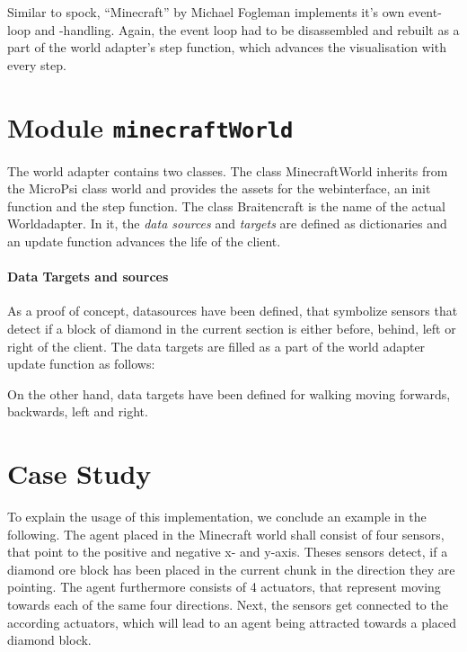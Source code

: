 Similar to spock, ``Minecraft'' by Michael Fogleman implements it's own event-loop and -handling. Again, the event loop had to be disassembled and rebuilt as a part of the world adapter's step function, which advances the visualisation with every step.

    \section{Module \texttt{minecraftWorld}}
The world adapter contains two classes. The class MinecraftWorld inherits from the MicroPsi class world and provides the assets for the webinterface, an init function and the step function. The class Braitencraft is the name of the actual Worldadapter. In it, the \emph{data sources} and \emph{targets} are defined as dictionaries and an update function advances the life of the client.
    
\paragraph{Data Targets and sources}

As a proof of concept, datasources have been defined, that symbolize sensors that detect if a block of diamond in the current section is either before, behind, left or right of the client. The data targets are filled as a part of the world adapter update function as follows:

On the other hand, data targets have been defined for walking moving forwards, backwards, left and right.


    \section{Case Study}
To explain the usage of this implementation, we conclude an example in the following. The agent placed in the Minecraft world shall consist of four sensors, that point to the positive and negative x- and y-axis. Theses sensors detect, if a diamond ore block has been placed in the current chunk in the direction they are pointing. The agent furthermore consists of 4 actuators, that represent moving towards each of the same four directions. Next, the sensors get connected to the according actuators, which will lead to an agent being attracted towards a placed diamond block.

